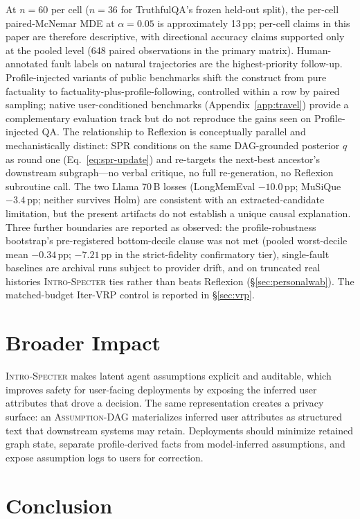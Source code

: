 \documentclass{article}
\newcommand{\method}{\textsc{Intro-Specter}\xspace}
\newcommand{\dagg}{\textsc{Assumption-DAG}\xspace}
\begin{document}
At $n{=}60$ per cell ($n{=}36$ for TruthfulQA's frozen held-out split), the per-cell paired-McNemar MDE at $\alpha{=}0.05$ is approximately 13\,pp; per-cell claims in this paper are therefore descriptive, with directional accuracy claims supported only at the pooled level (648 paired observations in the primary matrix). Human-annotated fault labels on natural trajectories are the highest-priority follow-up. Profile-injected variants of public benchmarks shift the construct from pure factuality to factuality-plus-profile-following, controlled within a row by paired sampling; native user-conditioned benchmarks (Appendix~\ref{app:travel}) provide a complementary evaluation track but do not reproduce the gains seen on Profile-injected QA. The relationship to Reflexion is conceptually parallel and mechanistically distinct: SPR conditions on the same DAG-grounded posterior $q$ as round one (Eq.~\ref{eq:spr-update}) and re-targets the next-best ancestor's downstream subgraph---no verbal critique, no full re-generation, no Reflexion subroutine call. The two Llama 70\,B losses (LongMemEval $-10.0$\,pp; MuSiQue $-3.4$\,pp; neither survives Holm) are consistent with an extracted-candidate limitation, but the present artifacts do not establish a unique causal explanation. Three further boundaries are reported as observed: the profile-robustness bootstrap's pre-registered bottom-decile clause was not met (pooled worst-decile mean $-0.34$\,pp; $-7.21$\,pp in the strict-fidelity confirmatory tier), single-fault baselines are archival runs subject to provider drift, and on truncated real histories \method ties rather than beats Reflexion (\S\ref{sec:personalwab}). The matched-budget Iter-VRP control is reported in §\ref{sec:vrp}.

\section*{Broader Impact}\label{sec:broader-impact}

\method makes latent agent assumptions explicit and auditable, which improves safety for user-facing deployments by exposing the inferred user attributes that drove a decision. The same representation creates a privacy surface: an \dagg materializes inferred user attributes as structured text that downstream systems may retain. Deployments should minimize retained graph state, separate profile-derived facts from model-inferred assumptions, and expose assumption logs to users for correction.

\section{Conclusion}
\end{document}
